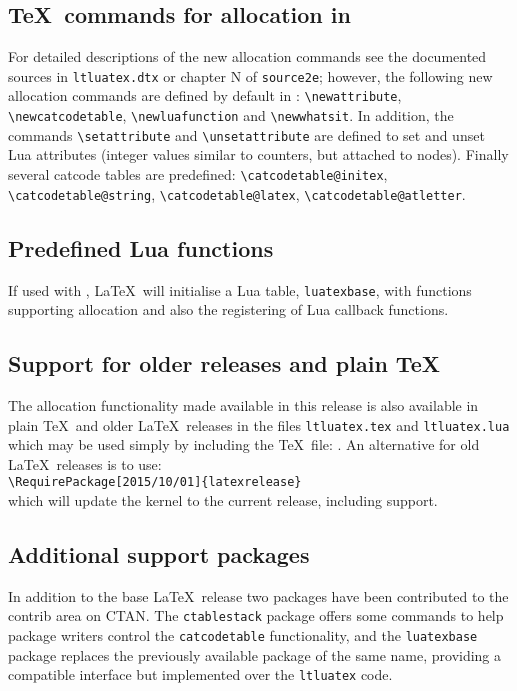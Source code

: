 \documentclass{ltnews}
\providecommand\pkg[1]{\texttt{#1}}
\providecommand\file[1]{\texttt{#1}}
\begin{document}
\subsection{\TeX\ commands for allocation in }
For detailed descriptions of the new allocation commands see the
documented sources in \file{ltluatex.dtx} or chapter N of
\file{source2e}; however, the following new allocation commands are
defined by default in :
\verb|\newattribute|,
\verb|\newcatcodetable|,
\verb|\newluafunction| and
\verb|\newwhatsit|.
In addition, the commands \verb|\setattribute| and
\verb|\unsetattribute| are defined to set and unset Lua attributes
(integer values similar to counters, but attached to nodes). Finally
several catcode tables are predefined:
\verb|\catcodetable@initex|,
\verb|\catcodetable@string|,
\verb|\catcodetable@latex|,
\verb|\catcodetable@atletter|.

\subsection{Predefined Lua functions}
If used with , \LaTeX\ will initialise a Lua table,
\texttt{luatexbase}, with functions supporting allocation and also
the registering of Lua callback functions.

\subsection{Support for older releases and plain \TeX}
The  allocation functionality made available in this
release is also available in plain \TeX\ and older \LaTeX\ releases
in the files \file{ltluatex.tex} and \file{ltluatex.lua} which may be
used simply by including the \TeX\ file: \verb||.
An alternative for old \LaTeX\ releases is to use:\\
\verb|\RequirePackage[2015/10/01]{latexrelease}|\\
which will update the kernel to the current release, including
 support.

\subsection{Additional  support packages}
In addition to the base \LaTeX\ release two packages have been
contributed to the \textsf{contrib} area on CTAN. The
\pkg{ctablestack} package offers some commands to help package
writers control the  \texttt{catcodetable}
functionality, and the \pkg{luatexbase} package replaces the
previously available package of the same name, providing a compatible
interface but implemented over the \pkg{ltluatex} code.
\end{document}
